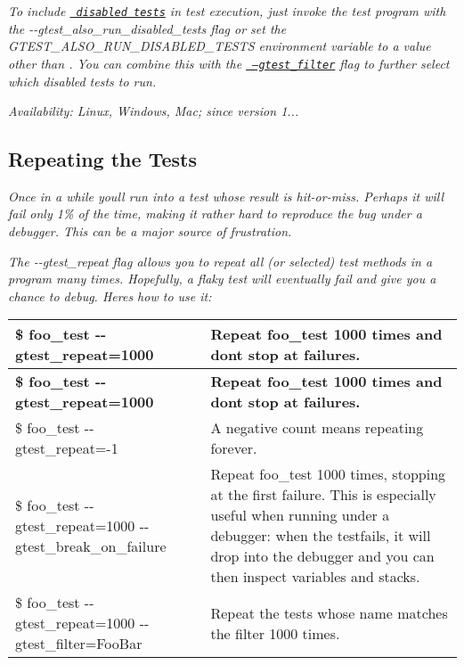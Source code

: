{\itshape To include \href{#temporarily-disabling-tests}\texttt{ disabled tests} in test execution, just invoke the test program with the {\ttfamily -\/-\/gtest\+\_\+also\+\_\+run\+\_\+disabled\+\_\+tests} flag or set the {\ttfamily G\+T\+E\+S\+T\+\_\+\+A\+L\+S\+O\+\_\+\+R\+U\+N\+\_\+\+D\+I\+S\+A\+B\+L\+E\+D\+\_\+\+T\+E\+S\+TS} environment variable to a value other than {}. You can combine this with the \href{#running-a-subset-of-the-tests}\texttt{ --gtest\+\_\+filter} flag to further select which disabled tests to run.}

{\itshape {\itshape Availability\+:} Linux, Windows, Mac; since version 1...}

{\itshape \subsection*{Repeating the Tests}}

{\itshape }

{\itshape Once in a while you\textquotesingle{}ll run into a test whose result is hit-\/or-\/miss. Perhaps it will fail only 1\% of the time, making it rather hard to reproduce the bug under a debugger. This can be a major source of frustration.}

{\itshape The {\ttfamily -\/-\/gtest\+\_\+repeat} flag allows you to repeat all (or selected) test methods in a program many times. Hopefully, a flaky test will eventually fail and give you a chance to debug. Here\textquotesingle{}s how to use it\+:}

{\itshape \tabulinesep=1mm
\begin{longtabu}spread 0pt [c]{*{2}{|X[-1]}|}
\hline
\cellcolor{\tableheadbgcolor}\textbf{ {\ttfamily \$ foo\+\_\+test -\/-\/gtest\+\_\+repeat=1000}  }&\cellcolor{\tableheadbgcolor}\textbf{ Repeat foo\+\_\+test 1000 times and don\textquotesingle{}t stop at failures.   }\\
\endfirsthead
\hline
\endfoot
\hline
\cellcolor{\tableheadbgcolor}\textbf{ {\ttfamily \$ foo\+\_\+test -\/-\/gtest\+\_\+repeat=1000}  }&\cellcolor{\tableheadbgcolor}\textbf{ Repeat foo\+\_\+test 1000 times and don\textquotesingle{}t stop at failures.   }\\
\endhead
{\ttfamily \$ foo\+\_\+test -\/-\/gtest\+\_\+repeat=-\/1}  &A negative count means repeating forever.   \\
{\ttfamily \$ foo\+\_\+test -\/-\/gtest\+\_\+repeat=1000 -\/-\/gtest\+\_\+break\+\_\+on\+\_\+failure}  &Repeat foo\+\_\+test 1000 times, stopping at the first failure. This is especially useful when running under a debugger\+: when the testfails, it will drop into the debugger and you can then inspect variables and stacks.   \\
{\ttfamily \$ foo\+\_\+test -\/-\/gtest\+\_\+repeat=1000 -\/-\/gtest\+\_\+filter=Foo\+Bar}  &Repeat the tests whose name matches the filter 1000 times.   \\
\end{longtabu}
}

